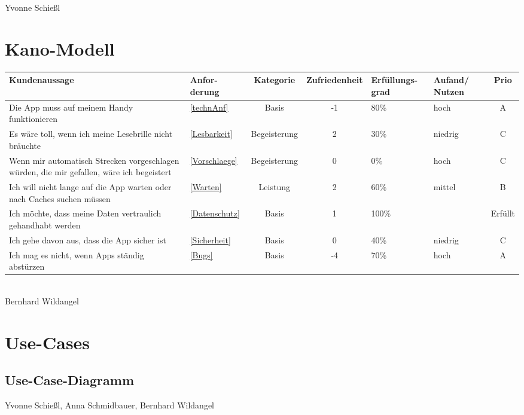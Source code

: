 \documentclass[a4paper, 12pt]{article}
\begin{document}
Yvonne Schießl

\section{Kano-Modell}
\begin{tabular}{ | p{5cm} | p{1.1cm} | c | c | p{1.7cm} | p{1.5cm} | c |}
\hline
Kundenaussage & Anfor-derung & Kategorie & Zufriedenheit & Erfüllungs-grad & Aufand/ Nutzen & Prio \\ \hline
Die App muss auf meinem Handy funktionieren  & \ref{technAnf} & Basis & -1 & 80\% & hoch & A \\ \hline
Es wäre toll, wenn ich meine Lesebrille nicht bräuchte & \ref{Lesbarkeit} & Begeisterung & 2 & 30\% & niedrig & C \\ \hline
Wenn mir automatisch Strecken vorgeschlagen würden, die mir gefallen, wäre ich begeistert & \ref{Vorschlaege} & Begeisterung & 0 & 0\% & hoch & C \\ \hline
Ich will nicht lange auf die App warten oder nach Caches suchen müssen & \ref{Warten} & Leistung & 2 & 60\% & mittel	& B \\ \hline
Ich möchte, dass meine Daten vertraulich gehandhabt werden & \ref{Datenschutz} & Basis & 1 & 100\% & & Erfüllt \\ \hline
Ich gehe davon aus, dass die App sicher ist & \ref{Sicherheit} & Basis & 0 & 40\% & niedrig & C \\ \hline
Ich mag es nicht, wenn Apps ständig abstürzen & \ref{Bugs} & Basis & -4 & 70\% & hoch & A \\ \hline
\end{tabular}\\

Bernhard Wildangel

\section{Use-Cases}
\subsection{Use-Case-Diagramm}

\begin{figure}[H] 
\centering
	\fbox{\begin{minipage}{16cm} 
	\end{minipage}}
\end{figure}
Yvonne Schießl, Anna Schmidbauer, Bernhard Wildangel
\end{document}
